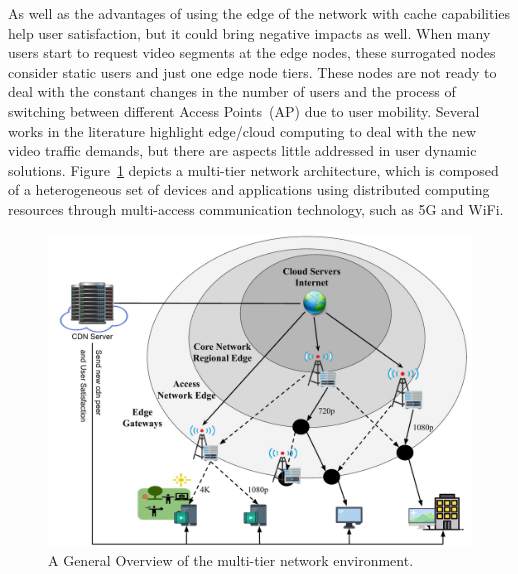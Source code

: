 As well as the advantages of using the edge of the network with cache capabilities help user satisfaction, but it could bring negative impacts as well. When many users start to request video segments at the edge nodes, these surrogated nodes consider static users and just one edge node tiers. These nodes are not ready to deal with the constant changes in the number of users and the process of switching between different Access Points~(AP) due to user mobility.
Several works in the literature highlight edge/cloud computing to deal with the new video traffic demands, but there are aspects little addressed in user dynamic solutions. Figure~\ref{fig:multi-tier-network} depicts a multi-tier network architecture, which is composed of a heterogeneous set of devices and applications using distributed computing resources through multi-access communication technology, such as 5G and WiFi.
%
%


\begin{figure}
    \centering
    \includegraphics[width=0.9\linewidth]{images/arch-video-content.pdf}
    \caption{A General Overview of the multi-tier network environment.}
    \label{fig:multi-tier-network}
\end{figure}

